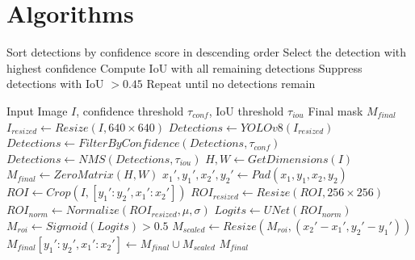 \documentclass[11pt,a4paper]{article}
\begin{document}
\section*{Algorithms}

\begin{algorithm}
\caption{Non-Maximum Suppression (NMS)}
\begin{algorithmic}[1]
\State Sort detections by confidence score in descending order
\State Select the detection with highest confidence
\State Compute IoU with all remaining detections
\State Suppress detections with IoU $> 0.45$
\State Repeat until no detections remain
\end{algorithmic}
\end{algorithm}

\begin{algorithm}
\caption{DetSEG Inference Pipeline}
\begin{algorithmic}[1]
\Require Input Image $I$, confidence threshold $\tau_{conf}$, IoU threshold $\tau_{iou}$
\Ensure Final mask $M_{final}$
\State $I_{resized} \gets Resize(I, 640 \times 640)$
\State $Detections \gets YOLOv8(I_{resized})$
\State $Detections \gets FilterByConfidence(Detections, \tau_{conf})$
\State $Detections \gets NMS(Detections, \tau_{iou})$
\State $H, W \gets GetDimensions(I)$
\State $M_{final} \gets ZeroMatrix(H, W)$
    \State $x_1', y_1', x_2', y_2' \gets Pad(x_1, y_1, x_2, y_2)$
    \State $ROI \gets Crop(I, [y_1':y_2', x_1':x_2'])$
    \State $ROI_{resized} \gets Resize(ROI, 256 \times 256)$
    \State $ROI_{norm} \gets Normalize(ROI_{resized}, \mu, \sigma)$
    \State $Logits \gets UNet(ROI_{norm})$
    \State $M_{roi} \gets Sigmoid(Logits) > 0.5$
    \State $M_{scaled} \gets Resize(M_{roi}, (x_2'-x_1', y_2'-y_1'))$
    \State $M_{final}[y_1':y_2', x_1':x_2'] \gets M_{final} \cup M_{scaled}$
\EndFor
\State \Return $M_{final}$
\end{algorithmic}
\end{algorithm}
\end{document}
